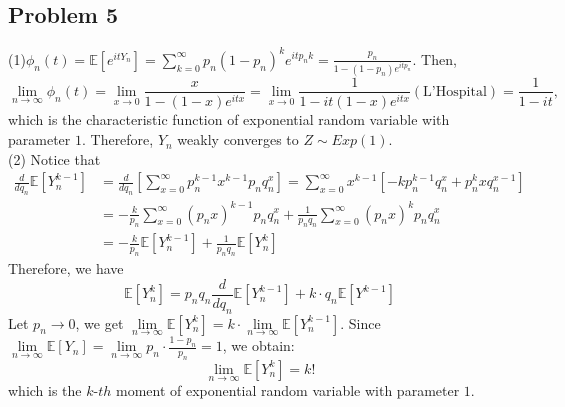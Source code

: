 \documentclass[12pt]{article}
\begin{document}
	\subsection*{Problem 5}
	(1)$\phi_{n}(t)=\mathbb{E}[e^{itY_{n}}]=\sum\limits_{k=0}^{\infty}p_{n}(1-p_{n})^{k}e^{itp_{n}k}=\frac{p_{n}}{1-(1-p_{n})e^{itp_{n}}}$. Then, $$\lim\limits_{n\rightarrow\infty}\phi_{n}(t)=\lim\limits_{x\rightarrow 0}\frac{x}{1-(1-x)e^{itx}}=\lim\limits_{x\rightarrow 0}\frac{1}{1-it(1-x)e^{itx}}(\text{L'Hospital})=\frac{1}{1-it},$$
which is the characteristic function of exponential random variable with parameter $1$. Therefore, $Y_{n}$ weakly converges to $Z\sim Exp(1)$.\\
(2) Notice that 
\begin{align*}
\frac{d}{d q_{n}}\mathbb{E}[Y_{n}^{k-1}]&=\frac{d}{d q_{n}}[\sum_{x=0}^{\infty}p_{n}^{k-1}x^{k-1}p_{n}q_{n}^{x}]=	\sum_{x=0}^{\infty}x^{k-1}[-kp_{n}^{k-1}q_{n}^{x}+p_{n}^{k}x q_{n}^{x-1}]\\
&=-\frac{k}{p_{n}}\sum_{x=0}^{\infty}(p_{n}x)^{k-1}p_{n}q_{n}^{x}+\frac{1}{p_{n}q_{n}}\sum_{x=0}^{\infty}(p_{n}x)^{k}p_{n}q_{n}^{x}\\
&=-\frac{k}{p_{n}}\mathbb{E}[Y_{n}^{k-1}]+\frac{1}{p_{n}q_{n}}\mathbb{E}[Y_{n}^{k}]
\end{align*}
Therefore, we have $$\mathbb{E}[Y_{n}^{k}]=p_{n}q_{n}\frac{d}{d q_{n}}\mathbb{E}[Y_{n}^{k-1}]+k\cdot q_{n}\mathbb{E}[Y^{k-1}]$$
Let $p_{n}\rightarrow 0$, we get $\lim\limits_{n\rightarrow\infty}\mathbb{E}[Y_{n}^{k}]=k\cdot \lim\limits_{n\rightarrow\infty}\mathbb{E}[Y_{n}^{k-1}]$.
Since $\lim\limits_{n\rightarrow\infty}\mathbb{E}[Y_{n}]=\lim\limits_{n\rightarrow\infty}p_{n}\cdot\frac{1-p_{n}}{p_{n}}=1$, we obtain: $$\lim\limits_{n\rightarrow\infty}\mathbb{E}[Y_{n}^k]=k!$$
which is the $k$-$th$ moment of exponential random variable with parameter $1$.
\end{document}

